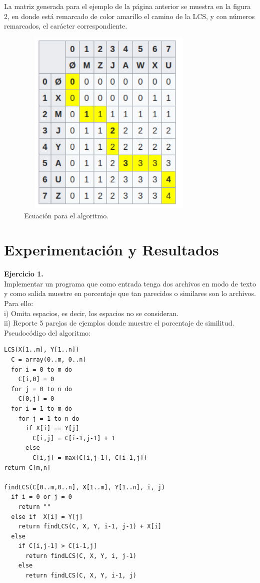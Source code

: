 \documentclass[12pt]{report}
\begin{document}
	La matriz generada para el ejemplo de la página anterior se muestra en la figura 2, en donde está remarcado de color amarillo el camino de la LCS, y con números remarcados, el carácter correspondiente. \\
		\begin{figure}[H]
			\includegraphics[height=9cm,width=9cm]{imagenes/2.png}
			\centering
			\caption{Ecuación para el algoritmo.}
			\centering
		\end{figure}
	\newpage

	\section{Experimentación y Resultados}	
	\textbf{Ejercicio 1.}\\
Implementar un programa que como entrada tenga dos archivos en modo de texto y
como salida muestre en porcentaje que tan parecidos o similares son lo archivos. Para ello:\\
i) Omita espacios, es decir, los espacios no se consideran.\\
ii) Reporte 5 parejas de ejemplos donde muestre el porcentaje de similitud.\\
	
	
	Pseudocódigo del algoritmo:
	\lstset{language=C, breaklines=true, basicstyle=\footnotesize}
	\lstset{numbers=left, numberstyle=\tiny, stepnumber=1, numbersep=10pt}
	\begin{lstlisting}
LCS(X[1..m], Y[1..n])
  C = array(0..m, 0..n)
  for i = 0 to m do
    C[i,0] = 0
  for j = 0 to n do
    C[0,j] = 0
  for i = 1 to m do
    for j = 1 to n do
      if X[i] == Y[j]
        C[i,j] = C[i-1,j-1] + 1
      else
        C[i,j] = max(C[i,j-1], C[i-1,j])
return C[m,n]  

findLCS(C[0..m,0..n], X[1..m], Y[1..n], i, j)
  if i = 0 or j = 0
    return ""
  else if  X[i] = Y[j]
    return findLCS(C, X, Y, i-1, j-1) + X[i]
  else
    if C[i,j-1] > C[i-1,j]
      return findLCS(C, X, Y, i, j-1)
    else
      return findLCS(C, X, Y, i-1, j)
	\end{lstlisting}
	
\end{document}
